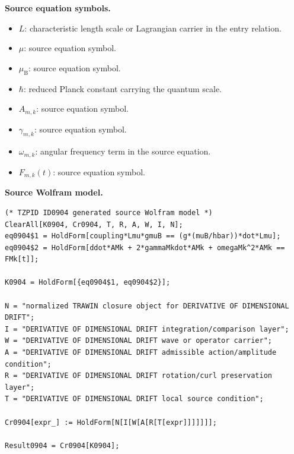 \begin{minipage}[t]{0.49\linewidth}
\begingroup
\small
\raggedright
\textbf{Source equation symbols.}\par
\begin{itemize}[leftmargin=1.35em,itemsep=1pt,topsep=1pt,parsep=0pt]
    \item $L$: characteristic length scale or Lagrangian carrier in the entry relation.
    \item $\mu$: source equation symbol.
    \item $\mu_{\mathrm{B}}$: source equation symbol.
    \item $\hbar$: reduced Planck constant carrying the quantum scale.
    \item $A_{m,k}$: source equation symbol.
    \item $\gamma_{m,k}$: source equation symbol.
    \item $\omega_{m,k}$: angular frequency term in the source equation.
    \item $F_{m,k}(t)$: source equation symbol.
\end{itemize}
\endgroup
\end{minipage}\hfill
\begin{minipage}[t]{0.47\linewidth}
\begingroup
\scriptsize
\raggedright
\textbf{Source Wolfram model.}\par
\begin{Verbatim}[fontsize=\tiny,breaklines=true,breakanywhere=true]
(* TZPID ID0904 generated source Wolfram model *)
ClearAll[K0904, Cr0904, T, R, A, W, I, N];
eq0904$1 = HoldForm[coupling*Lmu*gmuB == (g*(muB/hbar))*dot*Lmu];
eq0904$2 = HoldForm[ddot*AMk + 2*gammaMkdot*AMk + omegaMk^2*AMk == FMk[t]];

K0904 = HoldForm[{eq0904$1, eq0904$2}];

N = "normalized TRAWIN closure object for DERIVATIVE OF DIMENSIONAL DRIFT";
I = "DERIVATIVE OF DIMENSIONAL DRIFT integration/comparison layer";
W = "DERIVATIVE OF DIMENSIONAL DRIFT wave or operator carrier";
A = "DERIVATIVE OF DIMENSIONAL DRIFT admissible action/amplitude condition";
R = "DERIVATIVE OF DIMENSIONAL DRIFT rotation/curl preservation layer";
T = "DERIVATIVE OF DIMENSIONAL DRIFT local source condition";

Cr0904[expr_] := HoldForm[N[I[W[A[R[T[expr]]]]]]];

Result0904 = Cr0904[K0904];
\end{Verbatim}
\endgroup
\end{minipage}

